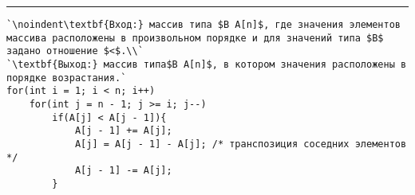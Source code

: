 \vspace{5pt} \hrule
\begin{lstlisting}[caption={Сортировка методом пузырька}, label=p186, escapechar=`]
`\noindent\textbf{Вход:} массив типа $B A[n]$, где значения элементов массива расположены в произвольном порядке и для значений типа $B$ задано отношение $<$.\\`
`\textbf{Выход:} массив типа$B A[n]$, в котором значения расположены в порядке возрастания.`
for(int i = 1; i < n; i++)
    for(int j = n - 1; j >= i; j--)
        if(A[j] < A[j - 1]){
            A[j - 1] += A[j];
            A[j] = A[j - 1] - A[j]; /* транспозиция соседних элементов */
            A[j - 1] -= A[j];
        }
\end{lstlisting}

